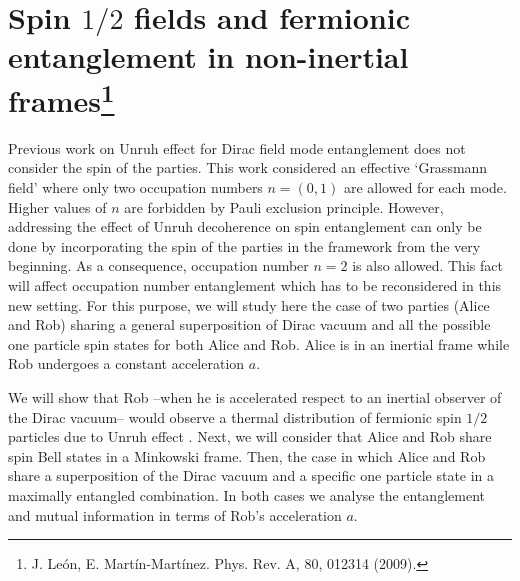 \chapter[Spin $1/2$ fields and fermionic entanglement in non-inertial frames]{Spin $1/2$ fields and fermionic entanglement in non-inertial frames\footnote{J. Le\'on, E. Mart\'in-Mart\'inez. Phys. Rev. A, 80, 012314 (2009).}}\label{onehalf}




Previous work \cite{AlsingSchul} on Unruh effect for Dirac field mode entanglement does not consider the spin of the parties. This work considered an effective `Grassmann field' where only two occupation numbers $n=(0,1)$ are allowed for each mode. Higher values of $n$ are forbidden by Pauli exclusion principle. However, addressing the effect of Unruh decoherence on spin entanglement can only be done by incorporating the spin of the parties in the framework from the very beginning. As a consequence, occupation number $n=2$ is also allowed. This fact will affect occupation number entanglement which has to be reconsidered in this new setting. For this purpose, we will study here the case of two parties (Alice and Rob) sharing a general superposition of Dirac vacuum and all the possible one particle spin states for both Alice and Rob. Alice is in an inertial frame while Rob undergoes a constant acceleration $a$.

We will show that Rob --when he is accelerated respect to an inertial observer of the Dirac vacuum-- would observe a thermal distribution of fermionic spin $1/2$ particles due to Unruh effect \cite{Unruh}. Next, we will consider that Alice and Rob share spin Bell states in a Minkowski frame. Then, the case in which Alice and Rob share a superposition of the Dirac vacuum and a specific one particle state in a maximally entangled combination. In both cases we analyse the entanglement and mutual information in terms of Rob's acceleration $a$.


